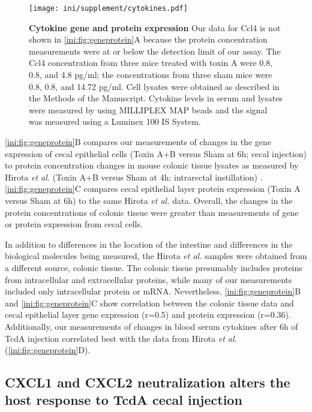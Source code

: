 \begin{figure}[t!]
\centering
\texttt{[image: ini/supplement/cytokines.pdf]}
\caption[Cytokine gene and protein expression]
         {\textbf{Cytokine gene and protein expression}
         Our data for Ccl4 is not shown
in \autoref{ini:fig:geneprotein}A because the protein concentration measurements
were at or below the detection limit of our assay. The Ccl4 concentration from
three mice treated with toxin A were 0.8, 0.8, and 4.8 pg/ml; the concentrations
from three sham mice were 0.8, 0.8, and 14.72 pg/ml. Cell 
lysates were obtained as described in the Methods of the Manuscript.
Cytokine levels in serum and lysates were measured by using
MILLIPLEX\textsuperscript{\textregistered{}}
MAP beads and the signal was measured using a Luminex 100 IS System.}
\label{ini:fig:geneprotein}
\end{figure}

\autoref{ini:fig:geneprotein}B compares our measurements of changes in the gene expression 
of cecal epithelial cells (Toxin A+B versus Sham at 6h; cecal injection) 
to protein concentration changes 
in mouse colonic tissue lysates as measured by
Hirota \emph{et al.} (Toxin A+B versus Sham at 4h; intrarectal instillation) \cite{Hirota:2012gx}. 
\autoref{ini:fig:geneprotein}C compares cecal epithelial layer protein expression (Toxin A
versus Sham at 6h) to the same Hirota \emph{et al.} data.
Overall, the changes in the protein concentrations of colonic tissue were greater
than measurements of gene or protein expression from cecal cells. 

In addition to differences in the location of the intestine and 
differences in the biological molecules being measured, the 
Hirota \emph{et al.} samples were obtained from a different source, colonic tissue.
The colonic tissue presumably includes proteins from
intracellular and extracellular proteins, while many of our measurements included
only intracellular protein or mRNA. Nevertheless, \autoref{ini:fig:geneprotein}B
and \autoref{ini:fig:geneprotein}C show correlation between the colonic tissue
data and cecal epithelial layer gene expression (r=0.5) and protein
expression (r=0.36). Additionally, our measurements of changes in blood serum
cytokines after 6h of TcdA injection correlated best with the data from 
Hirota \emph{et al.} (\autoref{ini:fig:geneprotein}D).

\subsection{CXCL1 and CXCL2 neutralization alters the host response to 
            TcdA cecal injection}
            
